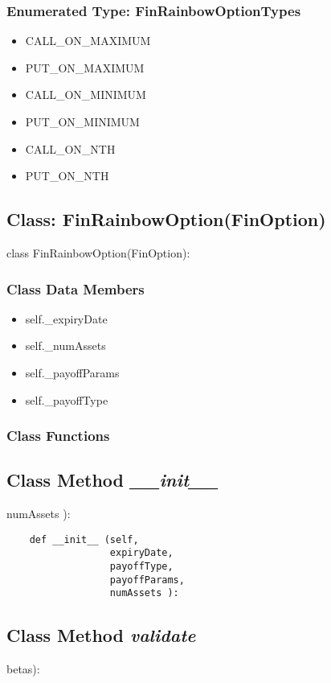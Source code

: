 \documentclass[twoside,11pt]{book}
\begin{document}
\subsubsection{Enumerated Type: FinRainbowOptionTypes}
\begin{itemize}
\item{CALL\_ON\_MAXIMUM}
\item{PUT\_ON\_MAXIMUM}
\item{CALL\_ON\_MINIMUM}
\item{PUT\_ON\_MINIMUM}
\item{CALL\_ON\_NTH}
\item{PUT\_ON\_NTH}
\end{itemize}

\subsection{Class: FinRainbowOption(FinOption)}
class FinRainbowOption(FinOption):

\subsubsection{Class Data Members}
\begin{itemize}
\item{self.\_expiryDate}
\item{self.\_numAssets}
\item{self.\_payoffParams}
\item{self.\_payoffType}
\end{itemize}

\subsubsection{Class Functions}

\subsection{Class Method {\it \_\_init\_\_ }}
numAssets ):

\begin{lstlisting}
    def __init__ (self,
                  expiryDate,
                  payoffType,
                  payoffParams,
                  numAssets ):
\end{lstlisting}

\subsection{Class Method {\it validate}}
betas):
\end{document}
